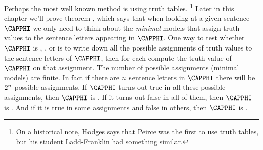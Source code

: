 Perhaps the most well known method is using truth tables.%
\footnote{%
On a historical note, Hodges \citeyearpar[5]{Hodges2001} says that Peirce \citeyearpar{Peirce1902} was the first to use truth tables, but his student Ladd-Franklin \citeyearpar[62]{LaddFranklin1883} had something similar.
} 
Later in this chapter we'll prove theorem , which says that when looking at a given \GSL{} sentence $\CAPPHI$ we only need to think about the \emph{minimal} models that assign truth values to the sentence letters appearing in $\CAPPHI$. 
One way to test whether $\CAPPHI$ is , , or  is to write down all the possible assignments of truth values to the sentence letters of $\CAPPHI$, then for each compute the truth value of $\CAPPHI$ on that assignment. 
The number of possible assignments (minimal models) are finite. 
In fact if there are $n$ sentence letters in $\CAPPHI$ there will be $2^{n}$ possible assignments. 
If $\CAPPHI$ turns out true in all these possible assignments, then $\CAPPHI$ is . 
If it turns out false in all of them, then $\CAPPHI$ is . 
And if it is true in some assignments and false in others, then $\CAPPHI$ is . 

